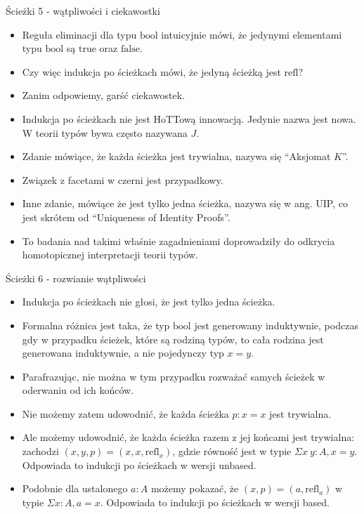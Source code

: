 \documentclass{beamer}
\newcommand{\refl}[1]{\text{refl}_{#1}}
\begin{document}
\begin{frame}{Ścieżki 5 - wątpliwości i ciekawostki}
\begin{itemize}
	\item Reguła eliminacji dla typu $\text{bool}$ intuicyjnie mówi, że jedynymi elementami typu $\text{bool}$ są $\text{true}$ oraz $\text{false}$.
	\item Czy więc indukcja po ścieżkach mówi, że jedyną ścieżką jest $\text{refl}$?
	\item Zanim odpowiemy, garść ciekawostek.
	\item Indukcja po ścieżkach nie jest HoTTową innowacją. Jedynie nazwa jest nowa. W teorii typów bywa często nazywana $J$.
	\item Zdanie mówiące, że każda ścieżka jest trywialna, nazywa się ``Aksjomat $K$''.
	\item Związek z facetami w czerni jest przypadkowy.
	\item Inne zdanie, mówiące że jest tylko jedna ścieżka, nazywa się w ang. UIP, co jest skrótem od ``Uniqueness of Identity Proofs''.
	\item To badania nad takimi właśnie zagadnieniami doprowadziły do odkrycia homotopicznej interpretacji teorii typów.
\end{itemize}
\end{frame}

\begin{frame}{Ścieżki 6 - rozwianie wątpliwości}
\begin{itemize}
	\item Indukcja po ścieżkach nie głosi, że jest tylko jedna ścieżka.
	\item Formalna różnica jest taka, że typ $\text{bool}$ jest generowany induktywnie, podczas gdy w przypadku ścieżek, które są rodziną typów, to cała rodzina jest generowana induktywnie, a nie pojedynczy typ $x = y$.
	\item Parafrazując, nie można w tym przypadku rozważać samych ścieżek w oderwaniu od ich końców.
	\item Nie możemy zatem udowodnić, że każda ścieżka $p : x = x$ jest trywialna.
	\item Ale możemy udowodnić, że każda ścieżka razem z jej końcami jest trywialna: zachodzi $(x, y, p) = (x, x, \refl{x})$, gdzie równość jest w typie $\Sigma x\ y : A, x = y$. Odpowiada to indukcji po ścieżkach w wersji unbased.
	\item Podobnie dla ustalonego $a : A$ możemy pokazać, że $(x, p) = (a, \refl{a})$ w typie $\Sigma x : A, a = x$. Odpowiada to indukcji po ścieżkach w wersji based.
\end{itemize}
\end{frame}
\end{document}
